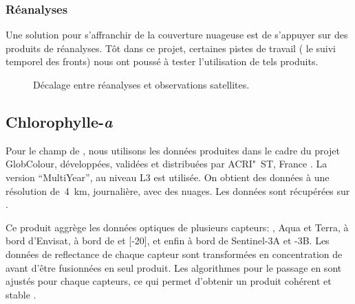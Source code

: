 \subsubsection{Réanalyses}
\label{sec:donnees-sst-reanalyses}

Une solution pour s'affranchir de la couverture nuageuse est de s'appuyer sur des produits de réanalyses.
Tôt dans ce projet, certaines pistes de travail ( le suivi temporel des fronts) nous ont poussé à tester l'utilisation de tels produits.


\begin{figure}
  \caption{Décalage entre réanalyses et observations satellites.}
  \label{fig:decalage-reanalyses}
\end{figure}

\subsection{Chlorophylle-\emph{a}}
\label{sec:donnees-chl}

Pour le champ de , nous utilisons les données produites dans le cadre du projet GlobColour, développées, validées et distribuées par ACRI"~ST, France \parencite{maritorena_2002}.
La version \enquote{MultiYear}, au niveau L3 est utilisée.
On obtient des données à une résolution de~\qty{4}{\km}, journalière, avec des nuages.
Les données sont récupérées sur .

Ce produit aggrège les données optiques de plusieurs capteurs: ,  Aqua et Terra,  à bord d'Envisat,  à bord de  et [-20], et enfin  à bord de Sentinel-3A et -3B.
Les données de reflectance de chaque capteur sont transformées en concentration de  avant d'être fusionnées en seul produit.
Les algorithmes pour le passage en  sont ajustés pour chaque capteurs, ce qui permet d'obtenir un produit cohérent et stable \parencite{garnesson_2019}.


